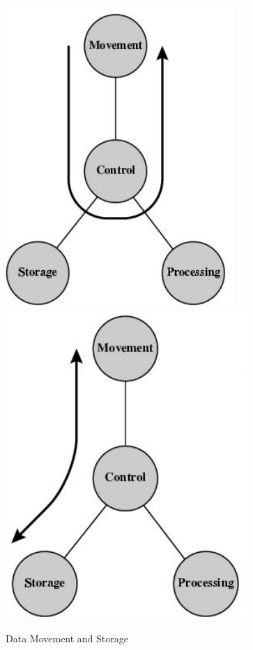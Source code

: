\documentclass[9pt,twocolumn]{article}
\begin{document}
    \begin{figure}[h]
      \centering
      \includegraphics[scale=0.4]{./assets/001/data-movement.png}
      \includegraphics[scale=0.4]{./assets/001/storage.png}
      \caption{Data Movement and Storage}
    \end{figure}
\end{document}
